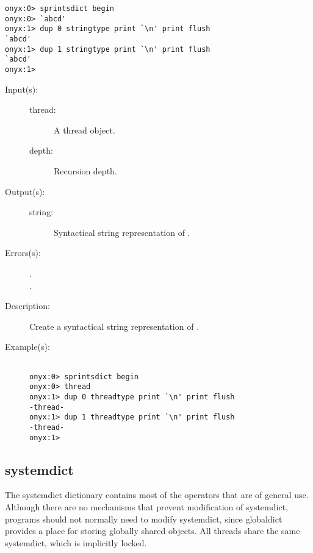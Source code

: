 \begin{description}
\begin{description}
\begin{verbatim}
onyx:0> sprintsdict begin
onyx:0> `abcd'
onyx:1> dup 0 stringtype print `\n' print flush
`abcd'
onyx:1> dup 1 stringtype print `\n' print flush
`abcd'
onyx:1>
		\end{verbatim}
	\end{description}
\label{sprintsdict:threadtype}
\item[{\onyxop{thread depth}{threadtype}{string}}: ]
	\begin{description}\item[]
	\item[Input(s): ]
		\begin{description}\item[]
		\item[thread: ]
			A thread object.
		\item[depth: ]
			Recursion depth.
		\end{description}
	\item[Output(s): ]
		\begin{description}\item[]
		\item[string: ]
			Syntactical string representation of .
		\end{description}
	\item[Errors(s): ]
		\begin{description}\item[]
		\item[.]
		\item[.]
		\end{description}
	\item[Description: ]
		Create a syntactical string representation of .
	\item[Example(s): ]\begin{verbatim}

onyx:0> sprintsdict begin
onyx:0> thread
onyx:1> dup 0 threadtype print `\n' print flush
-thread-
onyx:1> dup 1 threadtype print `\n' print flush
-thread-
onyx:1>
		\end{verbatim}
	\end{description}
\end{description}

\subsection{systemdict}
\label{sec:systemdict}

The systemdict dictionary contains most of the operators that are of general
use.  Although there are no mechanisms that prevent modification of systemdict,
programs should not normally need to modify systemdict, since globaldict
provides a place for storing globally shared objects.  All threads share the
same systemdict, which is implicitly locked.

